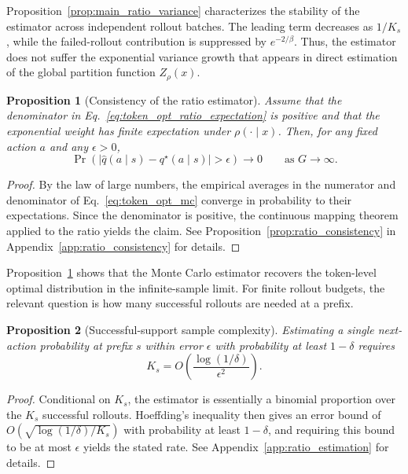 \documentclass{article}
\newtheorem{proposition}{Proposition}[section]
\begin{document}
Proposition~\ref{prop:main_ratio_variance} characterizes the stability of the estimator across independent rollout batches. The leading term decreases as $1/K_s$, while the failed-rollout contribution is suppressed by $e^{-2/\beta}$. Thus, the estimator does not suffer the exponential variance growth that appears in direct estimation of the global partition function $Z_\rho(x)$.

\begin{proposition}[Consistency of the ratio estimator]
\label{prop:main_ratio_consistency}
Assume that the denominator in Eq.~\eqref{eq:token_opt_ratio_expectation} is positive and that the exponential weight has finite expectation under $\rho(\cdot\mid x)$. Then, for any fixed action $a$ and any $\epsilon>0$,
\begin{equation}
\Pr\!\left(
\left|\widehat q(a\mid s)-q^\star(a\mid s)\right|>\epsilon
\right)
\to 0
\qquad \text{as } G\to\infty.
\label{eq:main_ratio_consistency}
\end{equation}
\end{proposition}

\begin{proof}
By the law of large numbers, the empirical averages in the numerator and denominator of Eq.~\eqref{eq:token_opt_mc} converge in probability to their expectations. 
Since the denominator is positive, the continuous mapping theorem applied to the ratio yields the claim. See Proposition~\ref{prop:ratio_consistency} in Appendix~\ref{app:ratio_consistency} for details.
\end{proof}

Proposition~\ref{prop:main_ratio_consistency} shows that the Monte Carlo estimator recovers the token-level optimal distribution in the infinite-sample limit. For finite rollout budgets, the relevant question is how many successful rollouts are needed at a prefix.

\begin{proposition}[Successful-support sample complexity]
\label{cor:single_action_support_complexity}
Estimating a single next-action probability at prefix $s$ within error $\epsilon$ with probability at least $1-\delta$ requires
\begin{equation}
K_s
=
O\!\left(
\frac{\log(1/\delta)}{\epsilon^2}
\right).
\label{eq:single_action_local_sample_complexity}
\end{equation}
\end{proposition}

\begin{proof}
Conditional on $K_s$, the estimator is essentially a binomial proportion over the $K_s$ successful rollouts. Hoeffding's inequality then gives an error bound of $O(\sqrt{\log(1/\delta)/K_s})$ with probability at least $1-\delta$, and requiring this bound to be at most $\epsilon$ yields the stated rate. See Appendix~\ref{app:ratio_estimation} for details.
\end{proof}
\end{document}
